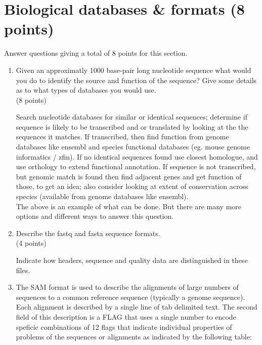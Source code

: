 \documentclass[11pt]{article}
\begin{document}
\section{ Biological databases \& formats (8 points) }
Answer questions giving a total of 8 points for this section.
\begin{enumerate}
\item Given an approximatly 1000 base-pair long nucleotide sequence what would
  you do to identify the source and function of the sequence? Give some
  details as to what types of databases you would use.\\
  (8 points)

\begin{Notes}
  Search nucleotide databases for similar or identical sequences; determine if
  sequence is likely to be transcribed and or translated by looking at the the
  sequences it matches. If transcribed, then find function from genome
  databases like ensembl and species functional databases (eg. mouse genome
  informatics / zfin). If no identical sequences found use closest homologue,
  and use orthology to extend functional annotation. If sequence is not
  transcribed, but genomic match is found then find adjacent genes and get
  function of those, to get an idea; also consider looking at extent of
  conservation across species (available from genome databases like
  ensembl).\\
  The above is an example of what can be done. But there are many more
  options and different ways to answer this question.
\end{Notes}

\item Describe the fastq and fasta sequence formats.\\
(4 points)

\begin{Notes}
  Indicate how headers, sequence and quality data are distinguished in these files.
\end{Notes}

\item The SAM format is used to describe the alignments of large numbers of
  sequences to a common reference sequence (typically a genome sequence). Each
  alignment is described by a single line of tab delimited text. The second
  field of this description is a FLAG that uses a single number to encode
  speficic combinations of 12 flags that indicate individual
  properties of problems of the sequences or alignments as indicated by the
  following table:


\end{enumerate}
\end{document}
